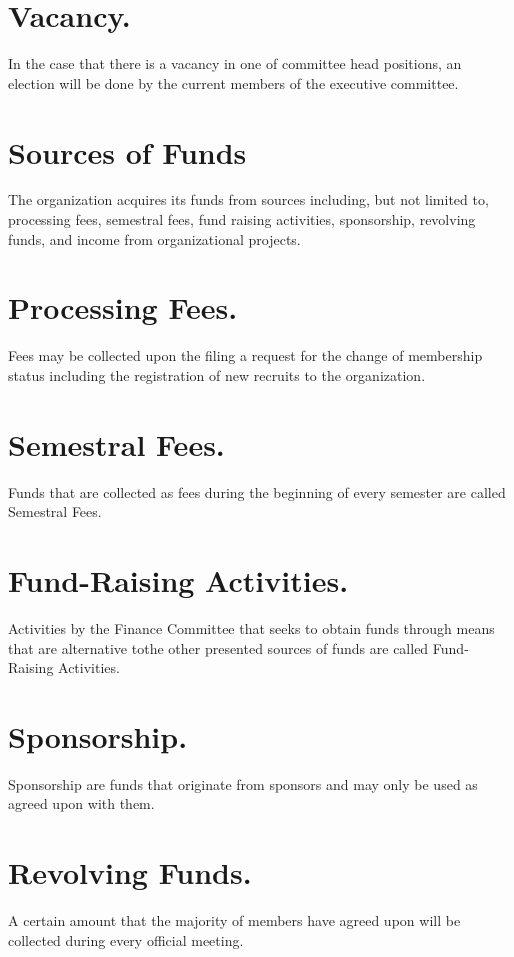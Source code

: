 \documentclass[12pt]{constitution}
\begin{document}
\section{Vacancy.}
In the case that there is a vacancy in one of committee head positions,
an election will be done by the current members of the executive committee.

\section{Sources of Funds}
The organization acquires its funds from sources including, but not limited to,
processing fees, semestral fees, fund raising activities, sponsorship,
revolving funds, and income from organizational projects.

\section{Processing Fees.}
Fees may be collected upon the filing a request for the change of membership status
including the registration of new recruits to the organization.

\section{Semestral Fees.}
Funds that are collected as fees during the beginning of every semester
are called Semestral Fees.

\section{Fund-Raising Activities.}
Activities by the Finance Committee that seeks to obtain funds through means
that are alternative tothe other presented sources of funds are called
Fund-Raising Activities.

\section{Sponsorship.}
Sponsorship are funds that originate from sponsors and may only be used as agreed upon with them.

\section{Revolving Funds.}
A certain amount that the majority of members have agreed upon will be collected during every official meeting.
\end{document}
